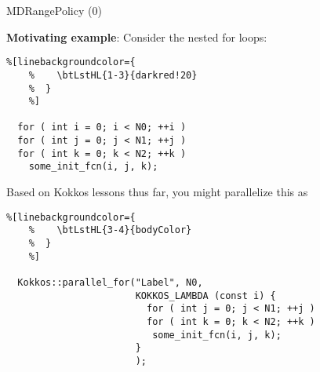 \begin{frame}[fragile]{MDRangePolicy (0)}

  \textbf{Motivating example}: Consider the nested for loops:



  \begin{lstlisting}%[linebackgroundcolor={
    %    \btLstHL{1-3}{darkred!20}
    %  }
    %]

  for ( int i = 0; i < N0; ++i )
  for ( int j = 0; j < N1; ++j )
  for ( int k = 0; k < N2; ++k )
    some_init_fcn(i, j, k);

  \end{lstlisting}



  {Based on Kokkos lessons thus far, you might parallelize this as}


  \begin{lstlisting}%[linebackgroundcolor={
    %    \btLstHL{3-4}{bodyColor}
    %  }
    %]

  Kokkos::parallel_for("Label", N0,
                       KOKKOS_LAMBDA (const i) {
                         for ( int j = 0; j < N1; ++j )
                         for ( int k = 0; k < N2; ++k )
                          some_init_fcn(i, j, k);
                       }
                       );
  \end{lstlisting}




  \vspace{-5pt}


\end{frame}
